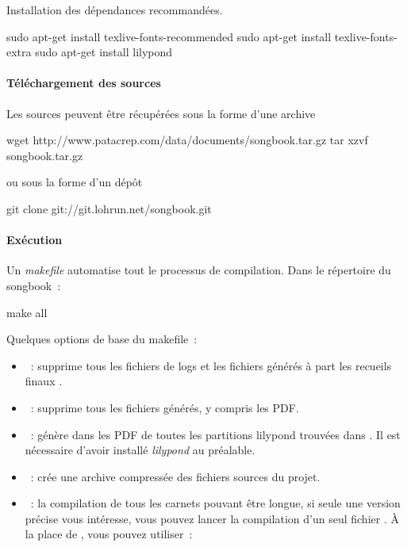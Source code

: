 Installation des dépendances recommandées.
\begin{unix}
  sudo apt-get install texlive-fonts-recommended
  sudo apt-get install texlive-fonts-extra
  sudo apt-get install lilypond
\end{unix}

\paragraph{Téléchargement des sources}

Les sources peuvent être récupérées sous la forme d'une archive 
\begin{unix}
  wget http://www.patacrep.com/data/documents/songbook.tar.gz
  tar xzvf songbook.tar.gz
\end{unix}

ou sous la forme d'un dépôt \git

\begin{unix}
  git clone git://git.lohrun.net/songbook.git
\end{unix}

\paragraph{Exécution}

Un \emph{makefile} automatise tout le processus de compilation. 
Dans le répertoire du songbook~:

\begin{unix}
  make all
\end{unix}

Quelques options de base du makefile~:
\begin{itemize}
\item {}~: supprime tous les fichiers de logs et
  les fichiers générés à part les recueils finaux .
\item {}~: supprime tous les fichiers générés,
  y compris les PDF.
\item {}~: génère dans  les
  PDF de toutes les partitions lilypond  trouvées dans
  . Il est nécessaire d'avoir installé
  \emph{lilypond} au préalable.
\item {}~: crée une archive compressée
   des fichiers sources du projet.
\item {}~: la compilation de tous les carnets
  pouvant être longue, si seule une version précise vous intéresse,
  vous pouvez lancer la compilation d'un seul fichier . À la place
  de , vous pouvez utiliser~:
\end{itemize}

